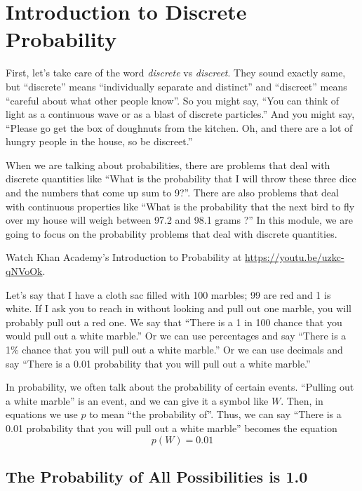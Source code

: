 \chapter{Introduction to Discrete Probability}

First, let's take care of the word \emph{discrete} vs \emph{discreet}.
They sound exactly same, but ``discrete'' means ``individually
separate and distinct'' and ``discreet'' means ``careful about what
other people know''.  So you might say, ``You can think of light as a
continuous wave or as a blast of discrete particles.'' And you might
say, ``Please go get the box of doughnuts from the kitchen. Oh, and
there are a lot of hungry people in the house, so be
discreet.''

When we are talking about probabilities, there are problems that deal
with discrete quantities like ``What is the probability that I will
throw these three dice and the numbers that come up sum to 9?''. There
are also problems that deal with continuous properties like ``What is
the probability that the next bird to fly over my house will weigh
between 97.2 and 98.1 grams ?'' In this module, we are going to focus
on the probability problems that deal with discrete quantities.

Watch Khan Academy's Introduction to Probability at \url{https://youtu.be/uzkc-qNVoOk}.

Let's say that I have a cloth sac filled with 100 marbles; 99 are red
and 1 is white. If I ask you to reach in without looking and pull out
one marble, you will probably pull out a red one. We say that ``There
is a 1 in 100 chance that you would pull out a white marble.'' Or we
can use percentages and say ``There is a 1\% chance that you will pull
out a white marble.'' Or we can use decimals and say ``There is a 0.01
probability that you will pull out a white marble.''

In probability, we often talk about the probability of certain
events. ``Pulling out a white marble'' is an event, and we can give it
a symbol like $W$. Then, in equations we use $p$ to mean ``the
probability of''.  Thus, we can say ``There is a 0.01 probability that
you will pull out a white marble'' becomes the equation
\begin{equation*}
  p(W) = 0.01
\end{equation*}

\section{The Probability of All Possibilities is 1.0}

